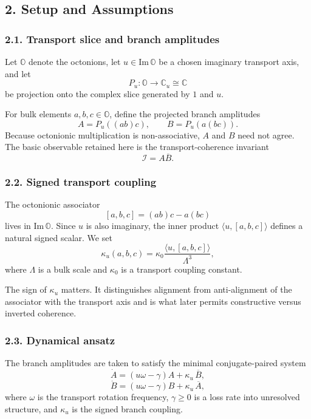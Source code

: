 \documentclass[
]{article}
\begin{document}
\subsection{2. Setup and Assumptions}\label{setup-and-assumptions}

\subsubsection{2.1. Transport slice and branch
amplitudes}\label{transport-slice-and-branch-amplitudes}

Let \(\mathbb{O}\) denote the octonions, let
\(u \in \mathrm{Im}\,\mathbb{O}\) be a chosen imaginary transport axis,
and let \[
P_u : \mathbb{O} \to \mathbb{C}_u \cong \mathbb{C}
\] be projection onto the complex slice generated by \(1\) and \(u\).

For bulk elements \(a,b,c \in \mathbb{O}\), define the projected branch
amplitudes \[
A = P_u((ab)c), \qquad B = P_u(a(bc)).
\] Because octonionic multiplication is non-associative, \(A\) and \(B\)
need not agree. The basic observable retained here is the
transport-coherence invariant \[
\mathcal{I} = A \overline{B}.
\]

\subsubsection{2.2. Signed transport
coupling}\label{signed-transport-coupling}

The octonionic associator \[
[a,b,c] = (ab)c - a(bc)
\] lives in \(\mathrm{Im}\,\mathbb{O}\). Since \(u\) is also imaginary,
the inner product \(\langle u,[a,b,c]\rangle\) defines a natural signed
scalar. We set \[
\kappa_{u}(a,b,c) = \kappa_0 \frac{\langle u,[a,b,c]\rangle}{\Lambda^3},
\] where \(\Lambda\) is a bulk scale and \(\kappa_0\) is a transport
coupling constant.

The sign of \(\kappa_{u}\) matters. It distinguishes alignment from
anti-alignment of the associator with the transport axis and is what
later permits constructive versus inverted coherence.

\subsubsection{2.3. Dynamical ansatz}\label{dynamical-ansatz}

The branch amplitudes are taken to satisfy the minimal conjugate-paired
system \[
\dot{A} = (u\omega - \gamma)A + \kappa_{u}\,\overline{B},
\] \[
\dot{B} = (u\omega - \gamma)B + \kappa_{u}\,\overline{A},
\] where \(\omega\) is the transport rotation frequency,
\(\gamma \ge 0\) is a loss rate into unresolved structure, and
\(\kappa_{u}\) is the signed branch coupling.
\end{document}
